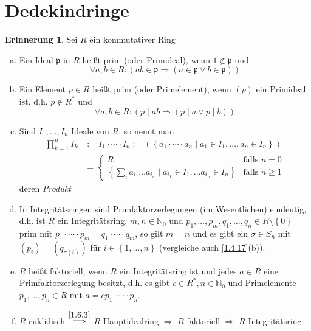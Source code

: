 \documentclass[
twoside=semi,
fontsize=12,
DIV=12, 
cleardoublepage=current,
leqno,
headings=optiontoheadandtoc, 
toc=idx
]{scrbook}
\newcommand{\N}{\mathbb{N}}
\newcommand{\brac}[1]{\left( #1 \right)}
\newcommand{\set}[1]{\left\{ #1 \right\}}
\theoremstyle{definition}
\newtheorem{erinnerung}[definition]{Erinnerung}
\begin{document}
 	\section{Dedekindringe}\thispagestyle{sectionstart}
 	\begin{erinnerung}\label{2.2.1}\hfill\newline
 		Sei $R$ ein kommutativer Ring
 		\begin{enumerate}[(a)]
 			\item Ein Ideal $\mathfrak{p}$ in $R$ hei\ss t prim (oder Primideal), wenn $1\notin \mathfrak{p}$ und
 				\[\forall a,b \in R: (ab \in \mathfrak{p} \Rightarrow (a \in \mathfrak{p} \lor b \in \mathfrak{p}))\]
 			
 			\item Ein Element $p \in R$ hei\ss t prim (oder Primelement), wenn $(p)$ ein Primideal ist, d.h. $p\notin R^*$ und
 				\[\forall a,b \in R: (p \mid ab \Rightarrow (p \mid a \lor p \mid b))\]
 			
 			\item Sind $I_1, \dots, I_n$ Ideale von $R$, so nennt man
 			\begin{align*}
 				\prod_{k=1}^n I_k &:= I_1 \cdot \cdots \cdot I_n := \brac{\set{a_1\cdot\cdots\cdot a_n \mid a_1 \in I_1, \dots, a_n \in I_n}}\\
 				&= \begin{cases}
 					R & \textrm{falls } n = 0\\
 					\set{\sum_i a_{i_1}\dots a_{i_n} \mid a_{i_1} \in I_1, \dots a_{i_n} \in I_n} & \textrm{falls } n\geq 1
 				\end{cases}
 			\end{align*} 
 			deren \emph{Produkt} 
 			
 			\item In Integrit\"atsringen sind Primfaktorzerlegungen (im Wesentlichen) eindeutig, d.h. ist $R$ ein Integrit\"atsring, $m,n \in\N_0$ und $p_1, \dots, p_m, q_1, \dots, q_n \in R\setminus \set{0}$ prim mit $p_1\cdot\cdots\cdot p_m = q_1\cdot\cdots\cdot q_m$, so gilt $m=n$ und es gibt ein $\sigma \in S_n$ mit $(p_i) = (q_{\sigma(i)})$ f\"ur $i \in \set{1,\dots, n}$ (vergleiche auch \ref{1.4.17}(b)).
 			
 			\item $R$ hei\ss t faktoriell, wenn $R$ ein Integrit\"atsring ist und jedes $a \in R$ eine Primfaktorzerlegung besitzt, d.h. es gibt $c \in R^*, n \in \N_0$ und Primelemente $p_1, \dots, p_n \in R$ mit $a = cp_1 \cdot \cdots \cdot p_n$.
 			
 			\item $R$ euklidisch $\overset{\ref{1.6.3}}{\Longrightarrow}$ $R$ Hauptidealring $\Longrightarrow$ $R$ faktoriell $\Longrightarrow$ $R$ Integrit\"atsring  
 		\end{enumerate}
 	\end{erinnerung}
 
\end{document}

